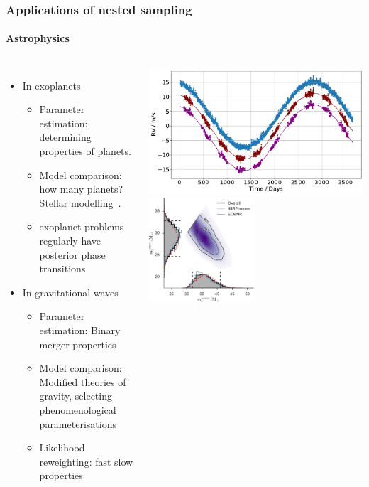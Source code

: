 \documentclass[aspectratio=169]{beamer}
\begin{document}
\begin{frame}
    \frametitle{Applications of nested sampling}
    \framesubtitle{Astrophysics}
    \begin{columns}
        \begin{itemize}
            \item In exoplanets~
                \begin{itemize}
                    \item Parameter estimation: determining properties of planets.
                    \item Model comparison: how many planets? Stellar modelling~.
                    \item exoplanet problems regularly have posterior phase transitions 
                \end{itemize}
            \item In gravitational waves
                \begin{itemize}
                    \item Parameter estimation: Binary merger properties
                    \item Model comparison: Modified theories of gravity, selecting phenomenological parameterisations~
                    \item Likelihood reweighting: fast slow properties
                \end{itemize}
        \end{itemize}
        \includegraphics[width=\textwidth]{figures/rv_full.pdf}
        \includegraphics[width=0.49\textwidth]{figures/ligo_m1_m2.pdf}

\end{columns}
\end{frame}
\end{document}
